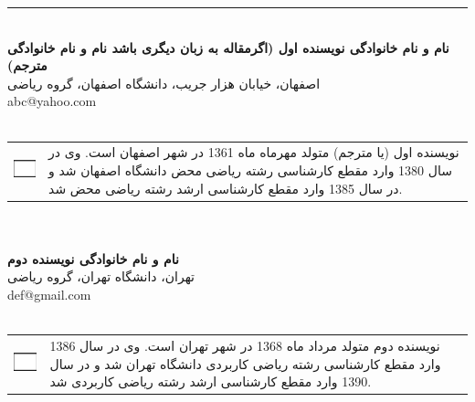\documentclass[11pt, twoside]{imsproc}
\begin{document}
\noindent \rule{.4\linewidth}{0.8pt}\\
\noindent\footnotesize{\bfseries نام و نام خانوادگی نویسنده اول (اگرمقاله به زبان دیگری باشد نام و نام خانوادگی مترجم) } \\
\footnotesize{اصفهان، خيابان هزار جريب، دانشگاه اصفهان، گروه ریاضی } \\
abc@yahoo.com\\\\
\begin{tabular}{p{2 cm} p{14 cm} }
\includegraphics[width=20mm]{Image1} 
&\vspace{-1.5cm}
\footnotesize

نویسنده اول (یا مترجم) متولد مهرماه ماه 1361 در شهر اصفهان است. وی در سال 1380 وارد مقطع كارشناسی رشته رياضی محض دانشگاه اصفهان شد و در سال 1385 وارد مقطع كارشناسی ارشد رشته رياضی محض شد.\\
\end{tabular}\\\\
\noindent\footnotesize{\bfseries نام و نام خانوادگی نویسنده دوم } \\
\footnotesize{تهران، دانشگاه تهران، گروه ریاضی } \\
 def@gmail.com\\\\
\begin{tabular}{p{2 cm} p{14 cm} }
\includegraphics[width=20mm]{Image2} 
&\vspace{-1.5cm}
\footnotesize

نویسنده دوم متولد مرداد ماه 1368 در شهر تهران است. وی در سال 1386 وارد مقطع كارشناسی رشته رياضی كاربردی دانشگاه تهران شد و در سال 1390  وارد مقطع كارشناسی ارشد رشته رياضی كاربردی شد.
\end{tabular}
\end{document}
